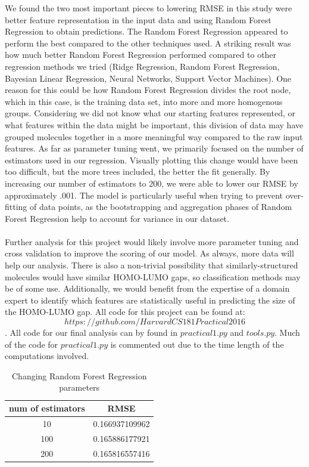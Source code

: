\documentclass{article}
\begin{document}
We found the two most important pieces to lowering RMSE in this study were better feature representation in the input data and using Random Forest Regression to obtain predictions. The Random Forest Regression appeared to perform the best compared to the other techniques used. A striking result was how much better Random Forest Regression performed compared to other regression methods we tried (Ridge Regression, Random Forest Regression, Bayesian Linear Regression, Neural Networks, Support Vector Machines). One reason for this could be how Random Forest Regression divides the root node, which in this case, is the training data set, into more and more homogenous groups.  Considering we did not know what our starting features represented, or what features within the data might be important, this division of data may have grouped molecules together in a more meaningful way compared to the raw input features. As far as parameter tuning went, we primarily focused on the number of estimators used in our regression. Visually plotting this change would have been too difficult, but the more trees included, the better the fit generally. By increasing our number of estimators to 200, we were able to lower our RMSE by approximately .001. The model is particularly useful when trying to prevent over-fitting of data points, as the bootstrapping and aggregation phases of Random Forest Regression help to account for variance in our dataset.\\\\
Further analysis for this project would likely involve more parameter tuning and cross validation to improve the scoring of our model. As always, more data will help our analysis. There is also a non-trivial possibility that similarly-structured molecules would have similar HOMO-LUMO gaps, so classification methods may be of some use. Additionally, we would benefit from the expertise of a domain expert to identify which features are statistically useful in predicting the size of the HOMO-LUMO gap. All code for this project can be found at: $$https://github.com/HarvardCS181Practical2016$$.
All code for our final analysis can by found in $practical1.py$ and $tools.py$. Much of the code for $practical1.py$ is commented out due to the time length of the computations involved. 
\begin{center}
\begin{table}
\centering
\begin{tabular}{ |c|c| } 
 \hline
num of estimators & RMSE \\
 \hline
 10 &  0.166937109962 \\ 
 100 & 0.165886177921 \\ 
 200 & 0.165816557416 \\ 
 \hline
\end{tabular}
\caption{Changing Random Forest Regression parameters}
\label{table:1}
\end{table}
\end{center}
\end{document}
